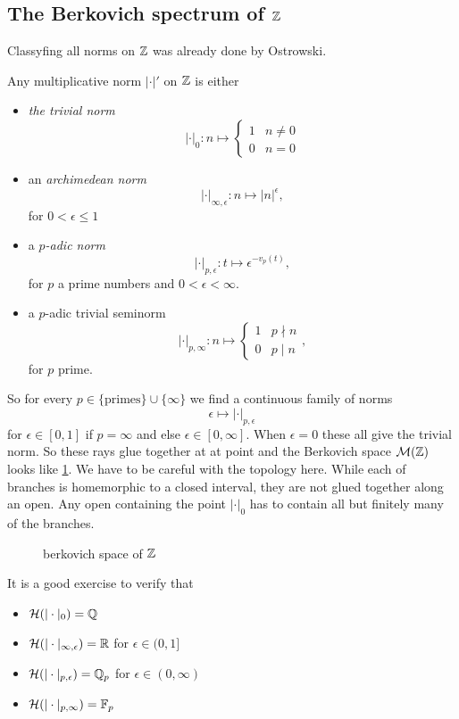 \subsection{The Berkovich spectrum of $\mathbb{Z}$} \label{sec:the_berkovich_spectrum_of_z}
Classyfing all norms on $\mathbb{Z}$ was already done by Ostrowski.
\begin{theorem}
	[Ostrowski]
	Any multiplicative norm $|\cdot |'$ on $\mathbb{Z}$ is either
	\begin{itemize}
		\item \emph{the trivial norm} \[
				|\cdot |_0: n \mapsto \begin{cases}
					1 & n \ne 0 \\
					0 & n = 0
				\end{cases}
			\]
		\item an \emph{archimedean norm} \[
				|\cdot |_{\infty, \epsilon}: n \mapsto |n|^{\epsilon},
			\]
			for $0 <  \epsilon \le 1$
		\item a \emph{$p$-adic norm} \[
				|\cdot |_{p, \epsilon}: t \mapsto \epsilon ^{- v_p(t)},
			\]
			for $p$ a prime numbers and $0 < \epsilon < \infty$. 
		\item a $p$-adic trivial seminorm 
			\[
			|\cdot |_{p, \infty}: n \mapsto \begin{cases}
				1 & p \nmid n \\
				0 & p \mid n
			\end{cases}
			,\] 
			for $p$ prime. 
	\end{itemize}
\end{theorem}
So for every $p \in \{\text{primes}\} \cup \{\infty\} $ we find a continuous family of norms \[
	\epsilon \mapsto|\cdot |_{p, \epsilon}
\] 
for $\epsilon \in [0, 1]$ if $p = \infty$ and else $\epsilon \in [0, \infty]$. 
When $\epsilon = 0$ these all give the trivial norm. 
So these rays glue together at at point and the Berkovich space $\mathcal{M} (\mathbb{Z})$ looks like \cref{fig:berkovich-space-of-z}.
We have to be careful with the topology here. 
While each of branches is homemorphic to a closed interval, they are not glued together along an open. 
Any open containing the point $|\cdot |_0$ has to contain all but finitely many of the branches. 

\begin{figure}[h]
    \centering
    \caption{berkovich space of $\mathbb{Z}$}
    \label{fig:berkovich-space-of-z}
\end{figure}


It is a good exercise to verify that 
\begin{itemize}
	\item  $\mathcal{H}(|\cdot |_0) = \mathbb{Q}$ 
	\item $\mathcal{H} (|\cdot |_{\infty, \epsilon}) = \mathbb{R}$ for $\epsilon \in (0, 1]$
	\item $\mathcal{H} (|\cdot |_{p, \epsilon}) = \mathbb{Q}_p$ for $\epsilon \in (0, \infty)$
	\item $\mathcal{H} (|\cdot |_{p, \infty}) = \mathbb{F}_p$ 
\end{itemize}



